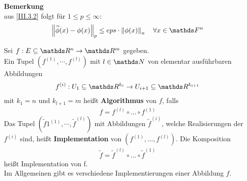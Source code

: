 \textbf{Bemerkung}\\
aus \eqref{III.3.2} folgt für $1\leq p\leq \infty$:
\begin{gather}
  \nn{\widetilde{\phi}(x)-\phi(x)}_p \leq eps\cdot\nn{\phi(x)}_n 
  \quad \forall x\in\F^n \label{III.3.3}
\end{gather}


\begin{Defe}
  Sei $f:E\subseteq \Ren \rightarrow \R^m$ gegeben.\\
  Ein Tupel $\left(f^{(1)},\cdots ,f^{(l)}\right)$ mit $l\in \N$ von elementar ausführbaren
  Abbildungen
  \begin{gather*}
    f^{(i)}: U_1\subseteq \R^{k_i} \rightarrow U_{i+1}\subseteq \R^{k_{i+1}}
  \end{gather*}
  mit $k_1=n$ und $k_{l+1}=m$ heißt \textbf{Algorithmus} von $f$, falls
  \begin{gather*}
    f=f	^{(l)}\circ \dotsc \circ f^{(1)}
  \end{gather*}
  Das Tupel $(\widetilde{f}1^{(1)},\cdots ,\widetilde{f}^{(l)})$ mit Abbildungen $\widetilde{f}^{(i)}$, welche Realisierungen der $f^{(i)}$ sind,
  heißt \textbf{Implementation} von 
  $\left(f^{(1)},\dotsc ,f^{(l)}\right)$.
  Die Komposition 
  \begin{gather*}
    \widetilde{f}=\widetilde{f}	^{(l)}\circ \dotsc \circ \widetilde{f}^{(1)}
  \end{gather*}
  heißt Implementation von f. \\
  Im Allgemeinen gibt es verschiedene Implementierungen einer Abbildung $f$.
\end{Defe}


